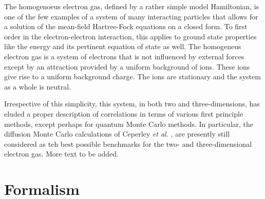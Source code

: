 \documentclass[aps,twocolumn,showpacs,floatfix,nofootinbib,preprintnumbers,superscriptaddress,amsmath,amssymb]{revtex4-1}
\begin{document}
The homogenoeus electron gas, defined by a rather simple model Hamiltonian,  is one of the few examples of a 
system of many interacting particles that allows for a solution
of the mean-field Hartree-Fock equations on a closed form. 
To first order in the electron-electron interaction, this applies 
to ground state properties like the energy and its pertinent equation of state as well. 
The homogeneus electron gas is a system of electrons  that is 
not influenced by external forces except by an attraction provided by a uniform background of ions. These ions give rise to a uniform background charge. 
The ions are stationary and the system as a  whole is neutral.

Irrespective of this simplicity, this system, in both two and three-dimensions, has eluded a proper description of correlations in terms of various
first principle methods, except perhaps for quantum Monte Carlo methods. In particular, the diffusion Monte Carlo calculations of Ceperley {\em et al.}  
\cite{ceperley1980,tanatar1989},  are presently still considered as teh best possible benchmarks for the two- and three-dimensional electron gas.
More text to be added. 

\section{Formalism}
\label{sec:formalism}
\end{document}
